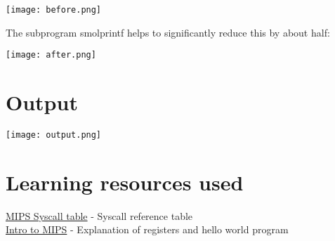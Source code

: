 \documentclass{article}
\begin{document}
\begin{center}
  \texttt{[image: before.png]}
\end{center}

The subprogram smolprintf helps to significantly reduce this by
about half:

\begin{center}
  \texttt{[image: after.png]}
\end{center}

\section{Output}

\begin{center}
  \texttt{[image: output.png]}
\end{center}

\section{Learning resources used}
\href{https://courses.missouristate.edu/kenvollmar/mars/help/syscallhelp.html}{MIPS Syscall table} 
- Syscall reference table \\
\href{https://www.youtube.com/watch?v=5AN4Fo0GiBI&t=525s}{Intro to MIPS} -
Explanation of registers and hello world program
\end{document}
